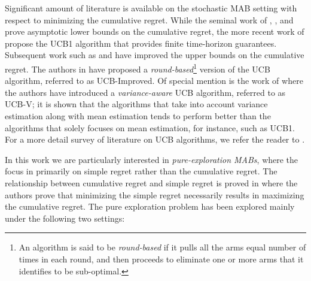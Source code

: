 Significant amount of literature is available on the stochastic MAB setting with respect to minimizing the cumulative regret. While the seminal work of \cite{robbins1952some}, \cite{thompson1933likelihood},  and \cite{lai1985asymptotically} prove asymptotic lower bounds on the cumulative regret, the more recent work of \cite{auer2002finite} propose the UCB1 algorithm that provides finite time-horizon guarantees. %
%
%
Subsequent work such as \cite{audibert2009minimax} and \cite{auer2010ucb} have improved the upper bounds on the cumulative regret. The authors in \cite{auer2010ucb} have proposed a \emph{round-based}\footnote{An algorithm is said to be \textit{round-based} if it pulls all the arms equal number of times in each round, and then proceeds to eliminate one or more arms that it identifies to be sub-optimal.} version of the UCB algorithm, referred to as UCB-Improved. Of special mention is the work of \cite{audibert2009exploration} where the authors have introduced a \emph{variance-aware} UCB algorithm, referred to as UCB-V; it is shown that the algorithms that take into account variance estimation along with mean estimation tends to perform better than the algorithms that solely focuses on mean estimation, for instance, such as UCB1.
For a more detail survey of literature on UCB algorithms, we refer the reader to \cite{bubeck2012regret}. 


	

In this work we are particularly interested in \emph{pure-exploration MABs},  where the focus in primarily on simple regret rather than the cumulative regret. The relationship between cumulative regret and simple regret is proved in \cite{bubeck2011pure} where the authors prove that minimizing the simple regret necessarily results in maximizing the cumulative regret.
The pure exploration problem has been explored  mainly under the following two settings:
	

